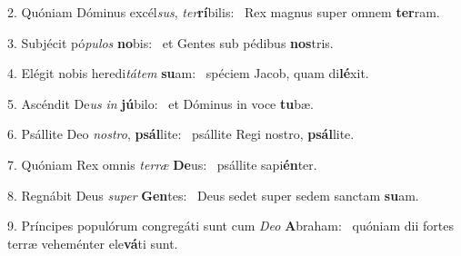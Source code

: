 2. Quóniam Dóminus excél\textit{sus}, \textit{ter}\textbf{rí}bilis: \ast\  Rex magnus super omnem \textbf{ter}ram.\

3. Subjécit pó\textit{pu}\textit{los} \textbf{no}bis: \ast\  et Gentes sub pédibus \textbf{nos}tris.\

4. Elégit nobis heredi\textit{tá}\textit{tem} \textbf{su}am: \ast\  spéciem Jacob, quam di\textbf{lé}xit.\

5. Ascéndit De\textit{us} \textit{in} \textbf{jú}bilo: \ast\  et Dóminus in voce \textbf{tu}bæ.\

6. Psállite Deo \textit{nos}\textit{tro}, \textbf{psál}lite: \ast\  psállite Regi nostro, \textbf{psál}lite.\

7. Quóniam Rex omnis \textit{ter}\textit{ræ} \textbf{De}us: \ast\  psállite sapi\textbf{én}ter.\

8. Regnábit Deus \textit{su}\textit{per} \textbf{Gen}tes: \ast\  Deus sedet super sedem sanctam \textbf{su}am.\

9. Príncipes populórum congregáti sunt cum \textit{De}\textit{o} \textbf{A}braham: \ast\  quóniam dii fortes terræ veheménter ele\textbf{vá}ti sunt.\

